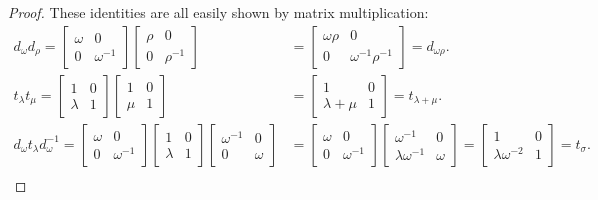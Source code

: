 \begin{proof} 
These identities are all easily shown by matrix multiplication:
\begin{align*} d_\omega d_\rho = \begin{bmatrix} \omega & 0 \\ 0 & \omega^{-1} \end{bmatrix} \begin{bmatrix} \rho & 0 \\ 0 & \rho^{-1} \end{bmatrix} &= \begin{bmatrix} \omega \rho & 0 \\ 0 & \omega^{-1} \rho^{-1} \end{bmatrix} = d_{\omega \rho}.
\\[1.5ex]
t_\lambda t_\mu = \begin{bmatrix} 1 & 0 \\ \lambda & 1 \end{bmatrix} \begin{bmatrix} 1 & 0 \\ \mu & 1 \end{bmatrix} &= \begin{bmatrix} 1 & 0 \\ \lambda + \mu & 1 \end{bmatrix} = t_{\lambda + \mu}.
\\[1.5ex]
 d_\omega t_\lambda d^{-1}_\omega = \! \begin{bmatrix} \omega & 0 \\ 0 & \omega^{-1} \end{bmatrix} \begin{bmatrix} 1 & 0 \\ \lambda & 1 \end{bmatrix} \begin{bmatrix} \omega^{-1} & 0 \\ 0 & \omega \end{bmatrix} &= \begin{bmatrix} \omega & 0 \\ 0 & \omega^{-1} \end{bmatrix} \! \begin{bmatrix} \omega^{-1} & 0 \\ \lambda \omega^{-1} & \omega \end{bmatrix} \! = \! \begin{bmatrix} 1 & 0 \\ \lambda \omega^{-2} & 1 \end{bmatrix} \! = t_\sigma.
\\[1.5ex]

\end{align*}
\end{proof}
